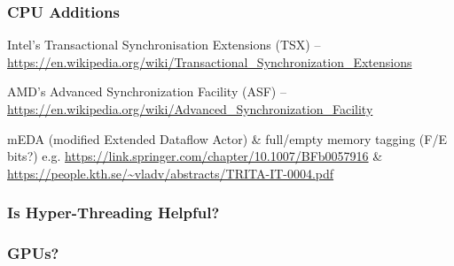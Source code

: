 \subsubsection{CPU Additions}
Intel's Transactional Synchronisation Extensions (TSX) -- \url{https://en.wikipedia.org/wiki/Transactional_Synchronization_Extensions}

AMD's Advanced Synchronization Facility (ASF) -- \url{https://en.wikipedia.org/wiki/Advanced_Synchronization_Facility}

mEDA (modified Extended Dataflow Actor) \& full/empty memory tagging (F/E bits?) e.g. \url{https://link.springer.com/chapter/10.1007/BFb0057916} \& \url{https://people.kth.se/~vladv/abstracts/TRITA-IT-0004.pdf}

\subsubsection{Is Hyper-Threading Helpful?}

\subsubsection{GPUs?}
